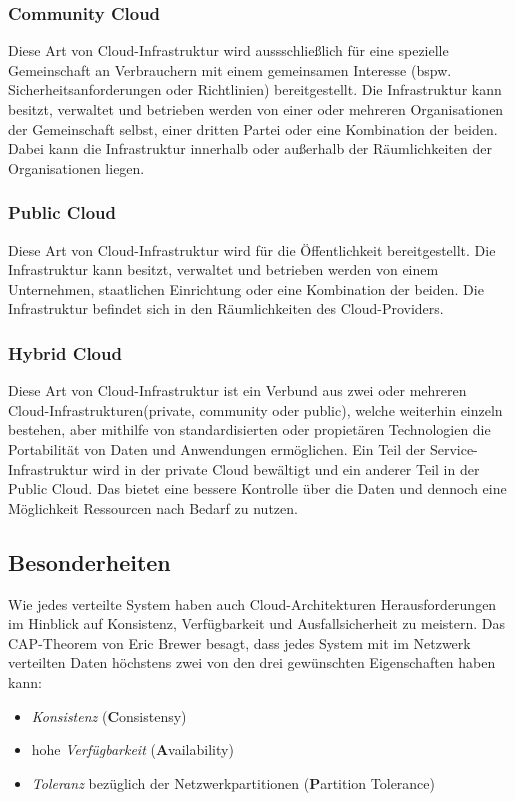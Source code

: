\subsubsection{Community Cloud}
Diese Art von Cloud-Infrastruktur wird aussschließlich für eine spezielle Gemeinschaft an Verbrauchern mit einem gemeinsamen Interesse (bspw. Sicherheitsanforderungen oder Richtlinien) bereitgestellt. Die Infrastruktur kann besitzt, verwaltet und betrieben werden von einer oder mehreren Organisationen der Gemeinschaft selbst, einer dritten Partei oder eine Kombination der beiden. Dabei kann die Infrastruktur innerhalb oder außerhalb der Räumlichkeiten der Organisationen liegen\cite{nist_definition}.

\subsubsection{Public Cloud}
Diese Art von Cloud-Infrastruktur wird für die Öffentlichkeit bereitgestellt. Die Infrastruktur kann besitzt, verwaltet und betrieben werden von einem Unternehmen, staatlichen Einrichtung oder eine Kombination der beiden. Die Infrastruktur befindet sich in den Räumlichkeiten des Cloud-Providers\cite{nist_definition}.

\subsubsection{Hybrid Cloud}
Diese Art von Cloud-Infrastruktur ist ein Verbund aus zwei oder mehreren Cloud-Infrastrukturen(private, community oder public), welche weiterhin einzeln bestehen, aber mithilfe von standardisierten oder propietären Technologien die Portabilität von Daten und Anwendungen ermöglichen\cite{nist_definition}. Ein Teil der Service-Infrastruktur wird in der private Cloud bewältigt und ein anderer Teil in der Public Cloud. Das bietet eine bessere Kontrolle über die Daten und dennoch eine Möglichkeit Ressourcen nach Bedarf zu nutzen\cite{study_cc_cdb}.

\subsection{Besonderheiten}
Wie jedes verteilte System haben auch Cloud-Architekturen Herausforderungen im Hinblick auf Konsistenz, Verfügbarkeit und Ausfallsicherheit zu meistern.
Das CAP-Theorem\cite{CAP} von Eric Brewer besagt, dass jedes System mit im Netzwerk verteilten Daten höchstens zwei von den drei gewünschten Eigenschaften haben kann:
\begin{itemize}
	\item \textit{Konsistenz} (\textbf{C}onsistensy)
	\item hohe \textit{Verfügbarkeit} (\textbf{A}vailability)
	\item \textit{Toleranz} bezüglich der Netzwerkpartitionen (\textbf{P}artition Tolerance)
\end{itemize}

